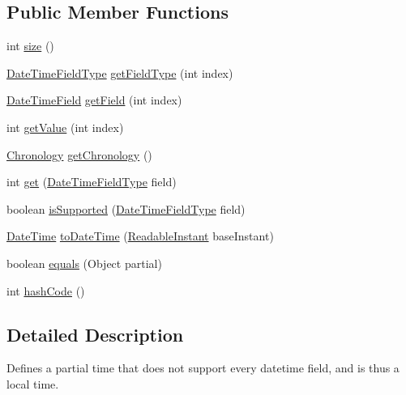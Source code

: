 \subsection*{Public Member Functions}
\begin{DoxyCompactItemize}
\item 
int \hyperlink{interfaceorg_1_1joda_1_1time_1_1_readable_partial_a2cbc5753aa7a7e36ebba1d8460f2809a}{size} ()
\item 
\hyperlink{classorg_1_1joda_1_1time_1_1_date_time_field_type}{Date\-Time\-Field\-Type} \hyperlink{interfaceorg_1_1joda_1_1time_1_1_readable_partial_a58424535f13ec5537ca78530fbb0875e}{get\-Field\-Type} (int index)
\item 
\hyperlink{classorg_1_1joda_1_1time_1_1_date_time_field}{Date\-Time\-Field} \hyperlink{interfaceorg_1_1joda_1_1time_1_1_readable_partial_a8db95369818265f5329e475457d0f2cb}{get\-Field} (int index)
\item 
int \hyperlink{interfaceorg_1_1joda_1_1time_1_1_readable_partial_aabea09e9a9f08ae0e594b0be9a7ee145}{get\-Value} (int index)
\item 
\hyperlink{classorg_1_1joda_1_1time_1_1_chronology}{Chronology} \hyperlink{interfaceorg_1_1joda_1_1time_1_1_readable_partial_a1068597bc2697f6daddb744be48188e9}{get\-Chronology} ()
\item 
int \hyperlink{interfaceorg_1_1joda_1_1time_1_1_readable_partial_a5844c779ac1ebd81281466fe2d23547a}{get} (\hyperlink{classorg_1_1joda_1_1time_1_1_date_time_field_type}{Date\-Time\-Field\-Type} field)
\item 
boolean \hyperlink{interfaceorg_1_1joda_1_1time_1_1_readable_partial_ae7477788d24376e625e07248ce8c7655}{is\-Supported} (\hyperlink{classorg_1_1joda_1_1time_1_1_date_time_field_type}{Date\-Time\-Field\-Type} field)
\item 
\hyperlink{classorg_1_1joda_1_1time_1_1_date_time}{Date\-Time} \hyperlink{interfaceorg_1_1joda_1_1time_1_1_readable_partial_a874b3d628bd8c1f969cc9d24dc6c11fb}{to\-Date\-Time} (\hyperlink{interfaceorg_1_1joda_1_1time_1_1_readable_instant}{Readable\-Instant} base\-Instant)
\item 
boolean \hyperlink{interfaceorg_1_1joda_1_1time_1_1_readable_partial_acd6a5380355f598ee9213ca7969b9a19}{equals} (Object partial)
\item 
int \hyperlink{interfaceorg_1_1joda_1_1time_1_1_readable_partial_a9f82fe654ac3bbf2b1913188589ec31a}{hash\-Code} ()
\end{DoxyCompactItemize}


\subsection{Detailed Description}
Defines a partial time that does not support every datetime field, and is thus a local time. 

